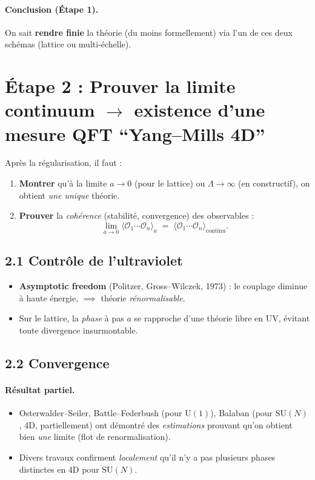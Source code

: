 \documentclass[11pt]{article}
\begin{document}
\paragraph{Conclusion (Étape 1).}
On sait \textbf{rendre finie} la théorie (du moins formellement) via l'un de ces deux schémas (lattice ou multi-échelle).

\section*{Étape 2 : Prouver la limite continuum \(\to\) existence d’une mesure QFT “Yang--Mills 4D”}

Après la régularisation, il faut :

\begin{enumerate}
  \item \textbf{Montrer} qu'à la limite $a\to0$ (pour le lattice) ou $\Lambda \to \infty$ (en constructif), on obtient \emph{une unique} théorie.
  \item \textbf{Prouver} la \emph{cohérence} (stabilité, convergence) des observables :
  \[
    \lim_{a \to 0}
    \bigl\langle \mathcal{O}_1 \cdots \mathcal{O}_n \bigr\rangle_{a}
    \;=\;
    \bigl\langle \mathcal{O}_1 \cdots \mathcal{O}_n \bigr\rangle_{\text{continu}}.
  \]
\end{enumerate}

\subsection*{2.1 Contrôle de l’ultraviolet}

\begin{itemize}
  \item \textbf{Asymptotic freedom} (Politzer, Gross--Wilczek, 1973) : le couplage diminue à haute énergie, $\implies$ théorie \emph{rénormalisable}.
  \item Sur le lattice, la \emph{phase} à pas $a$ se rapproche d'une théorie libre en UV, évitant toute divergence insurmontable.
\end{itemize}

\subsection*{2.2 Convergence}

\paragraph{Résultat partiel.}
\begin{itemize}
  \item Osterwalder--Seiler, Battle--Federbush (pour $\mathrm{U}(1)$), Balaban (pour $\mathrm{SU}(N)$, 4D, partiellement) ont démontré des \emph{estimations} prouvant qu'on obtient bien \emph{une} limite (flot de renormalisation).
  \item Divers travaux confirment \emph{localement} qu'il n'y a pas plusieurs phases distinctes en 4D pour $\mathrm{SU}(N)$.
\end{itemize}
\end{document}
